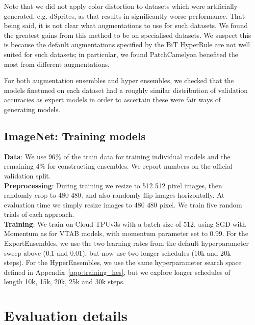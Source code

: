 \documentclass{article} \usepackage{iclr2021_conference,times}
\begin{document}
Note that we did not apply color distortion to datasets which were artificially generated, e.g. dSprites, as that results in significantly worse performance. That being said, it is not clear what augmentations to use for such datasets. We found the greatest gains from this method to be on specialised datasets. We suspect this is because the default augmentations specified by the BiT HyperRule are not well suited for such datasets; in particular, we found PatchCamelyon benefited the most from different augmentations.

For both augmentation ensembles and hyper ensembles, we checked that the models finetuned on each dataset had a roughly similar distribution of validation accuracies as expert models in order to ascertain these were fair ways of generating models.

\subsection{ImageNet: Training models}
\label{app:imagenet_training}
\textbf{Data}: We use 96\% of the train data for training individual models and the remaining 4\% for constructing ensembles. We report numbers on the official validation split.\\

\textbf{Preprocessing}:  During training we resize to 512  512 pixel images, then randomly crop to 480  480, and also randomly flip images horizontally. At evaluation time we simply resize images to 480  480 pixel. We train five random trials of each approach.\\

\textbf{Training}: We train on Cloud TPUv3s with a batch size of 512, using SGD with Momentum as for VTAB models, with momentum parameter set to 0.99. For the ExpertEnsembles, we use the two learning rates from the default hyperparameter sweep above (0.1 and 0.01), but now use two longer schedules (10k and 20k steps). For the HyperEnsembles, we use the same hyperparameter search space defined in Appendix~\ref{app:training_hes}, but we explore longer schedules of length 10k, 15k, 20k, 25k and 30k steps.

 \section{Evaluation details}
\end{document}
